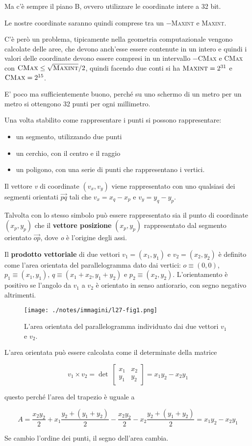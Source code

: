Ma c'è sempre il piano B, ovvero utilizzare le coordinate intere a 32 bit.

Le nostre coordinate saranno quindi comprese tra un $-$\textsc{Maxint} e \textsc{Maxint}.

C'è però un problema, tipicamente nella geometria computazionale vengono calcolate delle aree, che devono anch'esse essere contenute in un intero e quindi i valori delle coordinate devono essere compresi in un intervallo $-$\textsc{CMax} e \textsc{CMax} con $\textsc{CMax} \leq \sqrt{\textsc{Maxint}} /2$, quindi facendo due conti si ha $\textsc{Maxint} = 2^{31} $ e $\textsc{CMax} = 2^{15}$.

E' poco ma sufficientemente buono, perché su uno schermo di un metro per un metro si ottengono 32 punti per ogni millimetro.

Una volta stabilito come rappresentare i punti si possono rappresentare:

\begin{itemize}
\item   un segmento, utilizzando due punti
\item   un cerchio, con il centro e il raggio
\item   un poligono, con una serie di punti che rappresentano i vertici.
\end{itemize}

Il vettore \emph{v} di coordinate $(v_x, v_y)$ viene rappresentato con uno qualsiasi dei segmenti orientati $\overrightarrow{pq}$ tali
che $v_x = x_q-x_p$ e $v_y = y_q - y_p$.

Talvolta con lo stesso simbolo può essere rappresentato sia il punto di coordinate $(x_p,y_p)$ che il \textbf{vettore posizione} $(x_p,y_p)$ rappresentato dal segmento orientato $\overrightarrow{op}$, dove \textit{o} è l'origine degli assi.

Il \textbf{prodotto vettoriale} di due vettori $v_1 = (x_1,y_1)$ e $v_2 = (x_2,y_2)$ è definito come l'area orientata del parallelogramma dato dai vertici: $o \equiv (0,0)$, $p_1 \equiv (x_1,y_1)$, $q \equiv  (x_1+x_2, y_1+y_2)$ e $p_2 \equiv (x_2, y_2)$.
L'orientamento è positivo se l'angolo da $v_1$ a $v_2$ è orientato in senso antiorario, con segno negativo altrimenti.

\begin{figure}
	\centering
	\texttt{[image: ./notes/immagini/l27-fig1.png]}
	\caption{L'area orientata del parallelogramma individuato dai due vettori $v_1$ e $v_2$.}
\end{figure}

L'area orientata può essere calcolata come il determinate della matrice

$$
v_1 \times v_2 = \det \: \begin{bmatrix}
x_1 & x_2 \\
y_1 & y_2
\end{bmatrix} = x_1 y_2 - x_2 y_1
$$

questo perché l'area del trapezio è uguale a

$$
A = \frac{x_2y_2}{2} + x_1\frac{y_2+(y_1+y_2)}{2} - \frac{x_2y_2}{2} - x_2\frac{y_2+ (y_1+y_2)}{2} = x_1y_2 - x_2y_1
$$

Se cambio l'ordine dei punti, il segno dell'area cambia.
